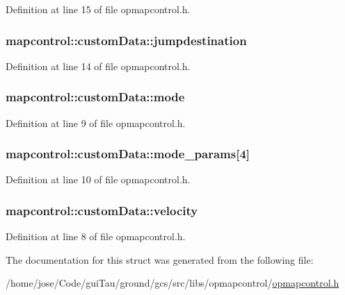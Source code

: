 Definition at line 15 of file opmapcontrol.\-h.

\hypertarget{structmapcontrol_1_1custom_data_a5e5179235bf8627c28c4c8b4ce0c8b84}{
\subsubsection[{jumpdestination}]{ mapcontrol\-::custom\-Data\-::jumpdestination}}\label{structmapcontrol_1_1custom_data_a5e5179235bf8627c28c4c8b4ce0c8b84}


Definition at line 14 of file opmapcontrol.\-h.

\hypertarget{structmapcontrol_1_1custom_data_a9279c0043a43ebef696356bae0099891}{
\subsubsection[{mode}]{ mapcontrol\-::custom\-Data\-::mode}}\label{structmapcontrol_1_1custom_data_a9279c0043a43ebef696356bae0099891}


Definition at line 9 of file opmapcontrol.\-h.

\hypertarget{structmapcontrol_1_1custom_data_ad6156981de3b51dd4942a6c4a53dbc8d}{
\subsubsection[{mode\-\_\-params}]{ mapcontrol\-::custom\-Data\-::mode\-\_\-params\mbox{[}4\mbox{]}}}\label{structmapcontrol_1_1custom_data_ad6156981de3b51dd4942a6c4a53dbc8d}


Definition at line 10 of file opmapcontrol.\-h.

\hypertarget{structmapcontrol_1_1custom_data_ab084fbb62527f0b71d74c9977c2e3f90}{
\subsubsection[{velocity}]{ mapcontrol\-::custom\-Data\-::velocity}}\label{structmapcontrol_1_1custom_data_ab084fbb62527f0b71d74c9977c2e3f90}


Definition at line 8 of file opmapcontrol.\-h.



The documentation for this struct was generated from the following file\-:\begin{DoxyCompactItemize}
\item 
/home/jose/\-Code/gui\-Tau/ground/gcs/src/libs/opmapcontrol/\hyperlink{opmapcontrol_8h}{opmapcontrol.\-h}\end{DoxyCompactItemize}
